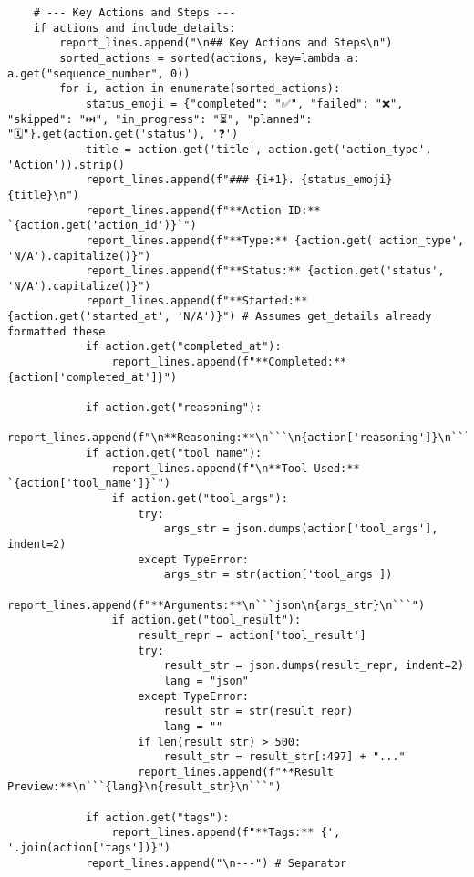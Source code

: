 \documentclass[12pt,a4paper]{article}
\begin{document}
\begin{pageablecode}
\begin{verbatim}
    # --- Key Actions and Steps ---
    if actions and include_details:
        report_lines.append("\n## Key Actions and Steps\n")
        sorted_actions = sorted(actions, key=lambda a: a.get("sequence_number", 0))
        for i, action in enumerate(sorted_actions):
            status_emoji = {"completed": "✅", "failed": "❌", "skipped": "⏭️", "in_progress": "⏳", "planned": "🗓️"}.get(action.get('status'), '❓')
            title = action.get('title', action.get('action_type', 'Action')).strip()
            report_lines.append(f"### {i+1}. {status_emoji} {title}\n")
            report_lines.append(f"**Action ID:** `{action.get('action_id')}`")
            report_lines.append(f"**Type:** {action.get('action_type', 'N/A').capitalize()}")
            report_lines.append(f"**Status:** {action.get('status', 'N/A').capitalize()}")
            report_lines.append(f"**Started:** {action.get('started_at', 'N/A')}") # Assumes get_details already formatted these
            if action.get("completed_at"): 
                report_lines.append(f"**Completed:** {action['completed_at']}")

            if action.get("reasoning"): 
                report_lines.append(f"\n**Reasoning:**\n```\n{action['reasoning']}\n```")
            if action.get("tool_name"):
                report_lines.append(f"\n**Tool Used:** `{action['tool_name']}`")
                if action.get("tool_args"):
                    try: 
                        args_str = json.dumps(action['tool_args'], indent=2)
                    except TypeError: 
                        args_str = str(action['tool_args'])
                    report_lines.append(f"**Arguments:**\n```json\n{args_str}\n```")
                if action.get("tool_result"):
                    result_repr = action['tool_result']
                    try:
                        result_str = json.dumps(result_repr, indent=2)
                        lang = "json"
                    except TypeError:
                        result_str = str(result_repr)
                        lang = ""
                    if len(result_str) > 500: 
                        result_str = result_str[:497] + "..."
                    report_lines.append(f"**Result Preview:**\n```{lang}\n{result_str}\n```")

            if action.get("tags"): 
                report_lines.append(f"**Tags:** {', '.join(action['tags'])}")
            report_lines.append("\n---") # Separator


\end{verbatim}
\end{pageablecode}
\end{document}
